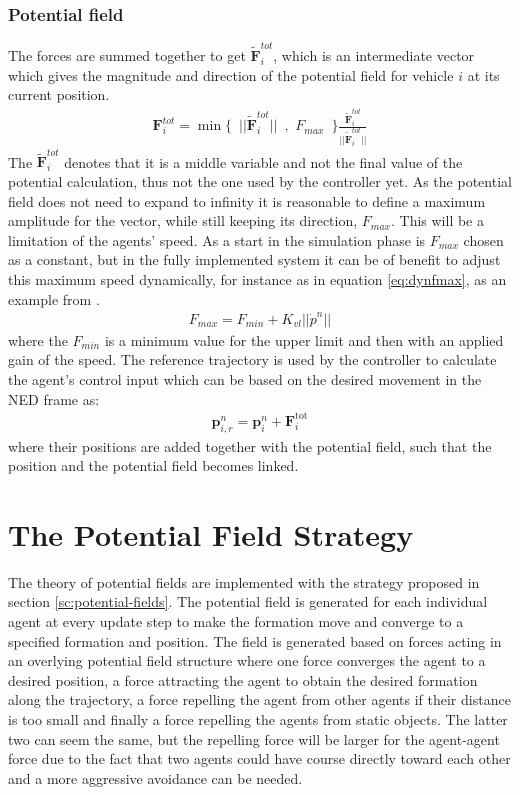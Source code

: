 \subsubsection{Potential field}
The forces are summed together to get
$\tilde{\mathbf{F}}_i^{tot}$, which is an intermediate vector which gives the magnitude and direction of the
potential field for vehicle $i$ at its current position.
\begin{align}
  \mathbf{F}_i^{tot} = \min\{\,\,\,||\tilde{\mathbf{F}}_i^{tot}||\,\,\,,\,\,F_{max}\,\,\,\}\frac{\tilde{\mathbf{F}}_i^{tot}}{||\tilde{\mathbf{F}}_i^{tot}||}
\end{align}
The $\tilde{\mathbf{F}}_i^{tot}$ denotes that it is a middle variable and not the final value of the potential calculation, thus not the one used by the controller yet.
As the potential field does not need to expand to infinity it is reasonable to define a maximum amplitude for the vector, while still keeping its direction, $F_{max}$. This will be a limitation of the agents' speed. As a start in the simulation phase is $F_{max}$ chosen as a constant, but in the fully implemented system it can be of benefit to adjust this maximum speed dynamically, for instance as in equation \ref{eq:dynfmax}, as an example from \citep{UAVff3dpf}.
\begin{align}
F_{max} = F_{min} + K_{vl}||\dot{p}^n||
\label{eq:dynfmax}
\end{align}
where the $F_{min}$ is a minimum value for the upper limit and then with an applied gain of the speed. 
The reference trajectory is used by the controller to calculate the agent's control input which can be based on the desired movement in the NED frame as:
\begin{align}
  \mathbf{p}_{i,r}^n = \mathbf{p}_i^n + \mathbf{F}_i ^\text{tot}
\end{align}
where their positions are added together with the potential field, such that the position and the potential field becomes linked.

\section{The Potential Field Strategy}
The theory of potential fields are implemented with the strategy
proposed in section \ref{sc:potential-fields}. The potential field is
generated for each individual agent at every update step to make the
formation move and converge to a specified formation and position. The
field is generated based on forces acting in an overlying potential
field structure where one force converges the agent to a desired
position, a force attracting the agent to obtain the desired formation
along the trajectory, a force repelling the agent from other agents if
their distance is too small and finally a force repelling the agents
from static objects. The latter two can seem the same, but the
repelling force will be larger for the agent-agent force due to the
fact that two agents could have course directly toward each other and
a more aggressive avoidance can be needed.

